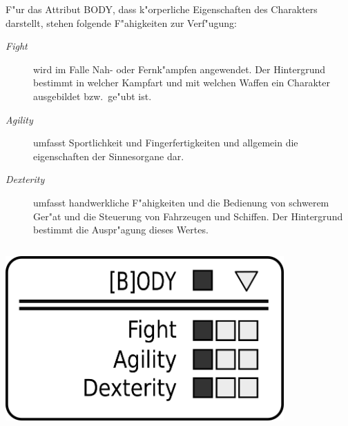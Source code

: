 \begin{column}[l]{0.55}
    F"ur das Attribut BODY, dass k"orperliche Eigenschaften des Charakters darstellt, stehen folgende F"ahigkeiten zur Verf"ugung:

    \begin{description}
        \item[\emph{Fight}] wird im Falle Nah- oder Fernk"ampfen angewendet. Der Hintergrund bestimmt in welcher Kampfart und mit welchen 
            Waffen ein Charakter ausgebildet bzw.~ge"ubt ist.
        \item[\emph{Agility}] umfasst Sportlichkeit und Fingerfertigkeiten und allgemein die eigenschaften der Sinnesorgane dar.
        \item[\emph{Dexterity}] umfasst handwerkliche F"ahigkeiten und die Bedienung von schwerem Ger"at und  die Steuerung von Fahrzeugen 
            und Schiffen. Der Hintergrund bestimmt die Auspr"agung dieses Wertes.
    \end{description}
\end{column}
\begin{column}[r]{0.45}
    \centering
    \includegraphics[width=0.80\textwidth]{images/character_body.png}
\end{column}

